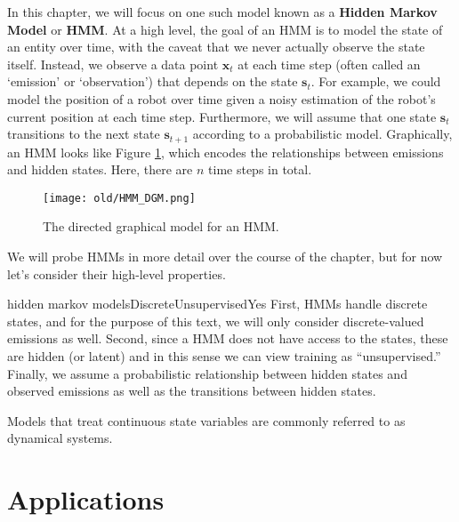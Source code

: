 
In this chapter, we will focus on one such model known as a \textbf{Hidden Markov Model} or \textbf{HMM}. At a high level, the goal of an HMM is to model the state of an entity over time, with the caveat that we never actually observe the state itself. Instead, we observe a data point $\textbf{x}_t$ at each time step (often called an `emission' or `observation') that depends on
the state $\textbf{s}_t$. For example, we could model the position of a robot over time given a noisy estimation of the robot's current position at each time step. Furthermore, we will assume that one state $\textbf{s}_t$ transitions to the next state $\textbf{s}_{t+1}$ according to a probabilistic model. Graphically, an HMM looks like Figure \ref{fig:HMM-DGM}, which encodes the relationships between emissions and hidden states.  Here, there are $n$ time steps in total.
%
\begin{figure}
    \centering
    \texttt{[image: old/HMM\_DGM.png]}
    \caption{The directed graphical model for an HMM.}
    \label{fig:HMM-DGM}
\end{figure}

We will probe HMMs in more detail over the course of the chapter, but for now let's consider their high-level properties.

\begin{mlcube}{hidden markov models}{Discrete}{Unsupervised}{Yes}
First, HMMs handle discrete states, and for the purpose of this text, we will only consider discrete-valued emissions as well. Second, since a HMM does not have access to the states, these are hidden (or latent) and in this sense we can view training as ``unsupervised.'' Finally, we assume a probabilistic relationship between hidden states and observed emissions as well as the transitions between hidden states.
\end{mlcube}

\begin{warning}
    Models that treat continuous state variables are commonly referred to as dynamical systems.
\end{warning}

\section{Applications}

